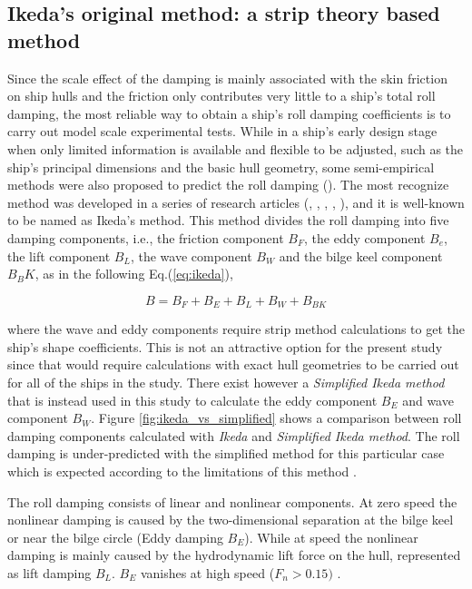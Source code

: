 
\subsection{Ikeda's original method: a strip theory based method}
\label{se:semi-empirical methods}
Since the scale effect of the damping is mainly associated with the skin friction on ship hulls and the friction only contributes very little to a ship's total roll damping, the most reliable way to obtain a ship's roll damping coefficients is to carry out model scale experimental tests. 
While in a ship's early design stage when only limited information is available and flexible to be adjusted, such as the ship's principal dimensions and the basic hull geometry, some semi-empirical methods were also proposed to predict the roll damping (\cite{himeno_prediction_1981}). The most recognize method was developed in a series of research articles (\cite{ikeda_roll_1978}, \cite{ikeda_eddy_1978}, \cite{ikeda_roll_1979}, \cite{ikeda_components_1978}, \cite{ikeda_velocity_1979}), and it is well-known to be named as Ikeda's method. This method divides the roll damping into five damping components, i.e., the friction component $B_F$, the eddy component $B_e$, the lift component $B_L$, the wave component $B_W$ and the bilge keel component $B_BK$, as in the following Eq.(\ref{eq:ikeda}), 

\begin{equation} \label{eq:ikeda}
B = B_F + B_E + B_L + B_W + B_{BK}
\end{equation}

where the wave and eddy components require strip method calculations to get the ship's shape coefficients. This is not an attractive option for the present study since that would require calculations with exact hull geometries to be carried out for all of the ships in the study. There exist however a \emph{Simplified Ikeda method} \cite{kawahara_simple_2011} that is instead used in this study to calculate the eddy component $B_E$ and wave component $B_W$. Figure \ref{fig:ikeda_vs_simplified} shows a comparison between roll damping components calculated with \emph{Ikeda} and \emph{Simplified Ikeda method}. The roll damping is under-predicted with the simplified method for this particular case which is expected according to the limitations of this method  \cite{kawahara_simple_2011}.



The roll damping consists of linear and nonlinear components. At zero speed the nonlinear damping is caused by the two-dimensional separation at the bilge keel or near the bilge circle (Eddy damping $B_E$). While at speed the nonlinear damping is mainly caused by the hydrodynamic lift force on the hull, represented as lift damping $B_L$. $B_E$ vanishes at high speed ($F_n>0.15)$ \cite{ikeda_components_1978}.

